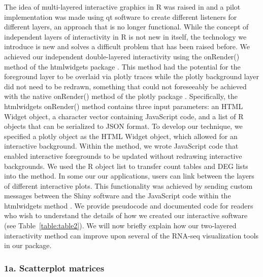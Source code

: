 \documentclass[parskip=full]{bmcart} %
\begin{document}
The idea of multi-layered interactive graphics in R was raised in \cite{xie2014reactive} and a pilot implementation was made using qt software to create different listeners for different layers, an approach that is no longer functional. While the concept of independent layers of interactivity in R is not new in itself, the technology we introduce is new and solves a difficult problem that has been raised before. We achieved our independent double-layered interactivity using the onRender() method of the htmlwidgets package \cite{htmlwidgets}. This method had the potential for the foreground layer to be overlaid via plotly traces while the plotly background layer did not need to be redrawn, something that could not foreseeably be achieved with the native onRender() method of the plotly package \cite{plotly}. Specifically, the htmlwidgets onRender() method contains three input parameters: an HTML Widget object, a character vector containing JavaScript code, and a list of R objects that can be serialized to JSON format. To develop our technique, we specified a plotly object as the HTML Widget object, which allowed for an interactive background. Within the method, we wrote JavaScript code that enabled interactive foregrounds to be updated without redrawing interactive backgrounds. We used the R object list to transfer count tables and DEG lists into the method. In some our our applications, users can link between the layers of different interactive plots. This functionality was achieved by sending custom messages between the Shiny software and the JavaScript code within the htmlwidgets method \cite{shiny}. We provide pseudocode and documented code for readers who wish to understand the details of how we created our interactive software (see Table~\ref{table:table2}). We will now briefly explain how our two-layered interactivity method can improve upon several of the RNA-seq visualization tools in our package. 

\subsubsection*{1a. Scatterplot matrices}
\end{document}
